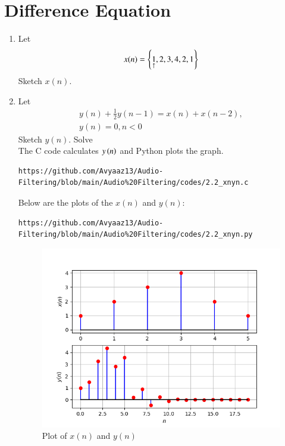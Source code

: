 \documentclass[journal,12pt,twocolumn]{IEEEtran}
\theoremstyle{remark}
\renewcommand\thesection{\arabic{section}}
\numberwithin{equation}{subsection}
\begin{document}
 \section{Difference Equation}
 \begin{enumerate}[label=\thesection.\arabic*,ref=\thesection.\theenumi]
\item Let
\begin{equation}
x(n) = \left\{\underset{\uparrow}{1},2,3,4,2,1\right\} \label{q:2.1}
\end{equation}
Sketch $x(n)$. 
\item Let
\begin{multline}
y(n) + \frac{1}{2}y(n-1) = x(n) + x(n-2),
\\
y(n) = 0, n < 0 \label{q:2.2}
\end{multline}
Sketch $y(n)$.
Solve\\
\solution  The C code calculates $y\left(n\right)$ and Python plots the graph.
\begin{lstlisting}
https://github.com/Avyaaz13/Audio-Filtering/blob/main/Audio%20Filtering/codes/2.2_xnyn.c
\end{lstlisting} 
Below are the plots of the $x(n)$ and $y(n)$:
\begin{lstlisting}
https://github.com/Avyaaz13/Audio-Filtering/blob/main/Audio%20Filtering/codes/2.2_xnyn.py
\end{lstlisting}

\begin{figure}[!ht]
	\centering
	\includegraphics[width=\columnwidth]{figs/Plot_xnyn.png}
	\caption{Plot of $x(n)$ and $y(n)$}
	\label{fig:xnyn_graph}
\end{figure}
\end{enumerate}
\end{document}
